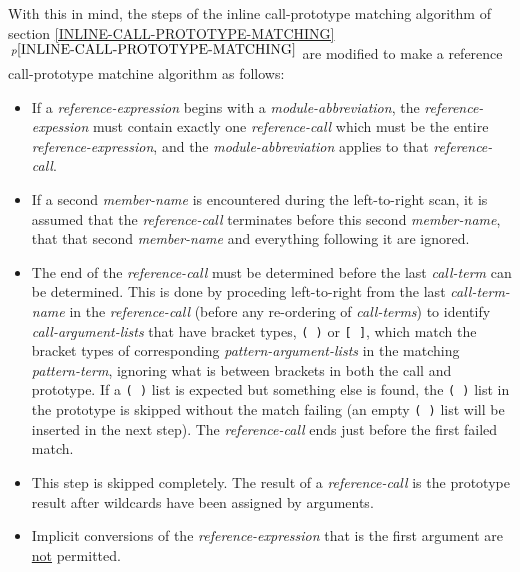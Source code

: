 \documentclass[12pt]{article}
\newcommand{\itemref}[1]{\ref{#1}$\,^{p\pageref{#1}}$}
\newcommand{\pagnote}[1]{$\,^{p\pageref{#1}}$}
\newenvironment{indpar}[1][0.3in]%
	{\begin{list}{}%
		     {\setlength{\itemsep}{0in}%
		      \setlength{\topsep}{0in}%
		      \setlength{\parsep}{1ex}%
		      \setlength{\labelwidth}{#1}%
		      \setlength{\leftmargin}{#1}%
		      \addtolength{\leftmargin}{\labelsep}}%
	 \item}%
	{\end{list}}
\begin{document}
With this in mind, the steps of the inline call-prototype matching algorithm
of section \itemref{INLINE-CALL-PROTOTYPE-MATCHING}
are modified to make a reference call-prototype matchine algorithm
as follows:
\begin{indpar}[3em] %
\begin{itemize}

\item[Step \ref{CALL-PROTOTYPE-MODULE-ABBREVIATION}%
           \pagnote{CALL-PROTOTYPE-MODULE-ABBREVIATION}]
If a {\em reference-expression} begins with a {\em module-abbreviation},
the {\em reference-expes\-sion} must contain exactly one {\em reference-call}
which must be the entire {\em reference-expression}, and the
{\em module-abbreviation} applies to that {\em reference-call}.

\item[Step \ref{CALL-PROTOTYPE-TERM-NAMES}%
           \pagnote{CALL-PROTOTYPE-TERM-NAMES}]
If a second {\em member-name} is encountered during the left-to-right
scan, it is assumed that the {\em reference-call} terminates before
this second {\em member-name}, that that second {\em member-name}
and everything following it are ignored.

\item[Step \ref{CALL-PROTOTYPE-CALL-TERMS}%
           \pagnote{CALL-PROTOTYPE-CALL-TERMS}]
The end of the {\em reference-call} must be determined before
the last {\em call-term} can be determined.  This is done
by proceding left-to-right from the last {\em call-term-name}
in the {\em reference-call} (before any re-ordering of {\em call-terms})
to identify {\em call-argument-lists} that have bracket types,
{\tt (~)} or {\tt [~]}, which match the bracket types of
corresponding {\em pattern-argument-lists} in the matching
{\em pattern-term}, ignoring what is between brackets in both the call
and prototype.  If a {\tt (~)} list is expected but something else is
found, the {\tt (~)} list in the prototype is skipped without the match
failing
(an empty {\tt (~)} list will be inserted in the next step).
The {\em reference-call} ends just before the first
failed match.

\item[Step \ref{CALL-PROTOTYPE-RESULT-MATCHING}%
           \pagnote{CALL-PROTOTYPE-RESULT-MATCHING}]
This step is skipped completely.  The result of a
{\em reference-call} is the prototype result after
wildcards have been assigned by arguments.

\item[Step \ref{CALL-PROTOTYPE-ARGUMENT-TYPING}%
           \pagnote{CALL-PROTOTYPE-ARGUMENT-TYPING}]

Implicit conversions of the {\em reference-expression}
that is the first argument are \underline{not} permitted.

\end{itemize}
\end{indpar}
\end{document}
